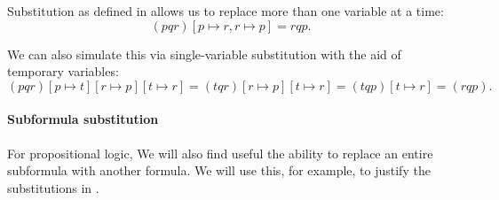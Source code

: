 \begin{remark}\label{rem:simulating_simultaneous_substitution}
  Substitution as defined in  allows us to replace more than one variable at a time:
  \begin{equation*}
    (pqr)[p \mapsto r, r \mapsto p]
    =
    rqp.
  \end{equation*}

  We can also simulate this via single-variable substitution with the aid of temporary variables:
  \begin{equation*}
    (pqr)[p \mapsto t][r \mapsto p][t \mapsto r]
    =
    (tqr)[r \mapsto p][t \mapsto r]
    =
    (tqp)[t \mapsto r]
    =
    (rqp).
  \end{equation*}
\end{remark}

\paragraph{Subformula substitution}

For propositional logic, We will also find useful the ability to replace an entire subformula with another formula. We will use this, for example, to justify the substitutions in .

